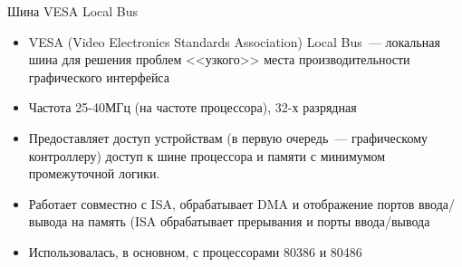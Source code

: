 \documentclass[aspectratio=169,14pt]{beamer}
\begin{document}
\begin{frame}{Шина VESA Local Bus}
    \begin{itemize}
        \item VESA (Video Electronics Standards Association) Local
        Bus~--- локальная шина для решения проблем <<узкого>> места
        производительности графического интерфейса
        \item Частота 25-40МГц (на частоте процессора), 32-х
        разрядная
        \item Предоставляет доступ устройствам (в первую очередь~---
        графическому контроллеру) доступ к шине процессора и памяти
        с минимумом промежуточной логики.
        \item Работает совместно с ISA, обрабатывает DMA и отображение
        портов ввода/вывода на память (ISA обрабатывает прерывания и
        порты ввода/вывода
        \item Использовалась, в основном, с процессорами 80386 и 80486
    \end{itemize}
\end{frame}
\end{document}
